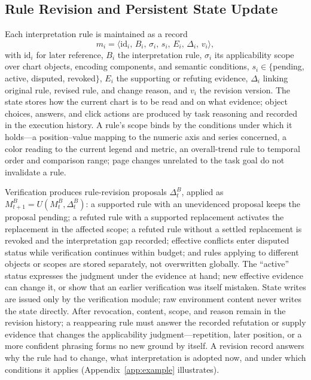 \subsection{Rule Revision and Persistent State Update}
\label{sec:method:state}

Each interpretation rule is maintained as a record
\begin{equation}\label{eq:m}
m_i = \langle
\mathrm{id}_i,\,
B_i,\,
\sigma_i,\,
s_i,\,
E_i,\,
\Delta_i,\,
v_i
\rangle,
\end{equation}
with $\mathrm{id}_i$ for later reference, $B_i$ the
interpretation rule, $\sigma_i$ its applicability
scope over chart objects, encoding components, and
semantic conditions, $s_i \in \{$pending, active,
disputed, revoked$\}$, $E_i$ the supporting or refuting
evidence, $\Delta_i$ linking original rule, revised
rule, and change reason, and $v_i$ the revision
version.
The state stores how the current chart is to be read
and on what evidence; object choices, answers, and
click actions are produced by task reasoning and
recorded in the execution history.
A rule's scope binds by the conditions under which it
holds---a position--value mapping to the numeric axis
and series concerned, a color reading to the current
legend and metric, an overall-trend rule to temporal
order and comparison range; page changes unrelated to
the task goal do not invalidate a rule.

Verification produces rule-revision proposals
$\Delta_t^B$, applied as $M_{t+1}^B = U(M_t^B,
\Delta_t^B)$: a supported rule with an unevidenced
proposal keeps the proposal pending; a refuted rule
with a supported replacement activates the replacement
in the affected scope; a refuted rule without a settled
replacement is revoked and the interpretation gap
recorded; effective conflicts enter disputed status
while verification continues within budget; and rules
applying to different objects or scopes are stored
separately, not overwritten globally.
The ``active'' status expresses the judgment under the
evidence at hand; new effective evidence can change it,
or show that an earlier verification was itself
mistaken.
State writes are issued only by the verification
module; raw environment content never writes the state
directly.
After revocation, content, scope, and reason remain in
the revision history; a reappearing rule must answer
the recorded refutation or supply evidence that changes
the applicability judgment---repetition, later position,
or a more confident phrasing forms no new ground by
itself.
A revision record answers why the rule had to change,
what interpretation is adopted now, and under which
conditions it applies (Appendix~\ref{app:example}
illustrates).

